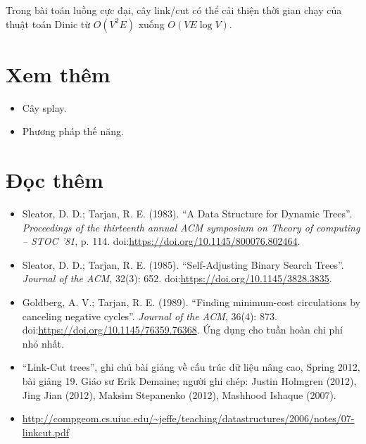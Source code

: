 \documentclass[11pt]{article}
\begin{document}
Trong bài toán luồng cực đại, cây link/cut có thể cải thiện thời gian chạy của
thuật toán Dinic từ $O(V^2E)$ xuống $O(VE\log V)$.

\section{Xem thêm}

\begin{itemize}
  \item Cây splay.
  \item Phương pháp thế năng.
\end{itemize}

\section{Đọc thêm}

\begin{sloppypar}
\begin{itemize}
  \item Sleator, D. D.; Tarjan, R. E. (1983). ``A Data Structure for Dynamic
  Trees''. \textit{Proceedings of the thirteenth annual ACM symposium on Theory
  of computing -- STOC '81}, p. 114. doi:\url{https://doi.org/10.1145/800076.802464}.

  \item Sleator, D. D.; Tarjan, R. E. (1985). ``Self-Adjusting Binary Search
  Trees''. \textit{Journal of the ACM}, 32(3): 652.
  doi:\url{https://doi.org/10.1145/3828.3835}.

  \item Goldberg, A. V.; Tarjan, R. E. (1989). ``Finding minimum-cost
  circulations by canceling negative cycles''. \textit{Journal of the ACM},
  36(4): 873. doi:\url{https://doi.org/10.1145/76359.76368}. Ứng dụng cho tuần
  hoàn chi phí nhỏ nhất.

  \item ``Link-Cut trees'', ghi chú bài giảng về cấu trúc dữ liệu nâng cao,
  Spring 2012, bài giảng 19. Giáo sư Erik Demaine; người ghi chép: Justin
  Holmgren (2012), Jing Jian (2012), Maksim Stepanenko (2012), Mashhood Ishaque
  (2007).

  \item \url{http://compgeom.cs.uiuc.edu/~jeffe/teaching/datastructures/2006/notes/07-linkcut.pdf}
\end{itemize}
\end{sloppypar}
\end{document}
